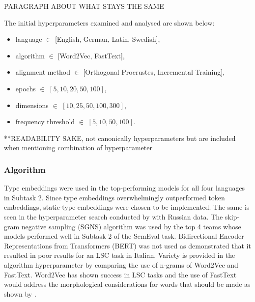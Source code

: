 PARAGRAPH ABOUT WHAT STAYS THE SAME




The initial hyperparameters examined and analysed are shown below:
\begin{itemize}
    \item language $\in$ [English, German, Latin, Swedish],
    \item algorithm $\in$ [Word2Vec, FastText],
    \item alignment method $\in$ [Orthogonal Procrustes, Incremental Training],
    \item epochs $\in$ $[5, 10, 20, 50, 100]$,
    \item dimensions $\in$ $[10, 25, 50, 100, 300]$,
    \item frequency threshold $\in$ $[5, 10, 50, 100]$.
\end{itemize}%


**READABILITY SAKE, not canonically hyperparameters but are included when mentioning combination of hyperparameter

\subsubsection{Algorithm}

Type embeddings were used in the top-performing models for all four languages in Subtask 2.  Since type embeddings overwhelmingly outperformed token embeddings, static-type embeddings were chosen to be implemented. The same is seen in the hyperparameter search conducted by \citet{hengchen2021SBXrushifteval} with Russian data. The skip-gram negative sampling (SGNS) algorithm was used by the top 4 teams whose models performed well in Subtask 2 of the SemEval task. Bidirectional Encoder Representations from Transformers (BERT) was not used as \citet{laicher-2020} demonstrated that it resulted in poor results for an LSC task in Italian. Variety is provided in the algorithm hyperparameter by comparing the use of n-grams of Word2Vec and FastText. Word2Vec has shown success in LSC tasks and the use of FastText would address the morphological considerations for words that should be made as shown by \citet{bojanowski2017enriching}.

